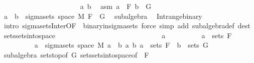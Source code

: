 \begin{isabellebody}
\ \ \ \ \isamarkupfalse%
\ {\isacharminus}{\kern0pt}\isanewline
\ \ \ \ \ \ \isacommand{{\isacharbraceleft}{\kern0pt}}\isamarkupfalse%
\isanewline
\ \ \ \ \ \ \ \ \isamarkupfalse%
\ a\ b\ \isamarkupfalse%
\ asm{\isacharcolon}{\kern0pt}\ {\isachardoublequoteopen}a\ {\isasymin}\ F{\isachardoublequoteclose}\ {\isachardoublequoteopen}b\ {\isasymin}\ G{\isachardoublequoteclose}\isanewline
\ \ \ \ \ \ \ \ \isamarkupfalse%
\ {\isachardoublequoteopen}a\ {\isasyminter}\ b\ {\isasymin}\ sigma{\isacharunderscore}{\kern0pt}sets\ {\isacharparenleft}{\kern0pt}space\ M{\isacharparenright}{\kern0pt}\ {\isacharparenleft}{\kern0pt}F\ {\isasymunion}\ G{\isacharparenright}{\kern0pt}{\isachardoublequoteclose}\ \isamarkupfalse%
\ subalgebra\ \isamarkupfalse%
\ Int{\isacharunderscore}{\kern0pt}range{\isacharunderscore}{\kern0pt}binary\ \isamarkupfalse%
\ {\isacharparenleft}{\kern0pt}intro\ sigma{\isacharunderscore}{\kern0pt}sets{\isacharunderscore}{\kern0pt}Inter{\isacharbrackleft}{\kern0pt}OF\ {\isacharunderscore}{\kern0pt}\ binary{\isacharunderscore}{\kern0pt}in{\isacharunderscore}{\kern0pt}sigma{\isacharunderscore}{\kern0pt}sets{\isacharbrackright}{\kern0pt}{\isacharparenright}{\kern0pt}\ {\isacharparenleft}{\kern0pt}force\ simp\ add{\isacharcolon}{\kern0pt}\ subalgebra{\isacharunderscore}{\kern0pt}def\ dest{\isacharcolon}{\kern0pt}\ sets{\isachardot}{\kern0pt}sets{\isacharunderscore}{\kern0pt}into{\isacharunderscore}{\kern0pt}space{\isacharparenright}{\kern0pt}{\isacharplus}{\kern0pt}\isanewline
\ \ \ \ \ \ \isacommand{{\isacharbraceright}{\kern0pt}}\isamarkupfalse%
\isanewline
\ \ \ \ \ \ \isamarkupfalse%
\isanewline
\ \ \ \ \ \ \isacommand{{\isacharbraceleft}{\kern0pt}}\isamarkupfalse%
\isanewline
\ \ \ \ \ \ \ \ \isamarkupfalse%
\ a\isanewline
\ \ \ \ \ \ \ \ \isamarkupfalse%
\ {\isachardoublequoteopen}a\ {\isasymin}\ sets\ F{\isachardoublequoteclose}\isanewline
\ \ \ \ \ \ \ \ \isamarkupfalse%
\ {\isachardoublequoteopen}a\ {\isasymin}\ sigma{\isacharunderscore}{\kern0pt}sets\ {\isacharparenleft}{\kern0pt}space\ M{\isacharparenright}{\kern0pt}\ {\isacharbraceleft}{\kern0pt}a\ {\isasyminter}\ b\ {\isacharbar}{\kern0pt}a\ b{\isachardot}{\kern0pt}\ a\ {\isasymin}\ sets\ F\ {\isasymand}\ b\ {\isasymin}\ sets\ G{\isacharbraceright}{\kern0pt}{\isachardoublequoteclose}\isanewline
\ \ \ \ \ \ \ \ \ \ \isamarkupfalse%
\ subalgebra\ sets{\isachardot}{\kern0pt}top{\isacharbrackleft}{\kern0pt}of\ G{\isacharbrackright}{\kern0pt}\ sets{\isachardot}{\kern0pt}sets{\isacharunderscore}{\kern0pt}into{\isacharunderscore}{\kern0pt}space{\isacharbrackleft}{\kern0pt}of\ {\isacharunderscore}{\kern0pt}\ F{\isacharbrackright}{\kern0pt}\ \isanewline

\end{isabellebody}
